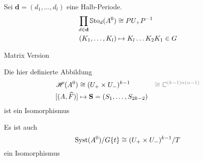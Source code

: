 \begin{frame}[t]
  \begin{lem}
    Sei $\textbf{d}=(d_1,\dots,d_l)$ eine Halb-Periode.
    \begin{align*}
      \prod_{d\in\textbf{d}}\operatorname{\mathbb{S}to}_d(A^0) &\cong PU_+P^{-1}\\
      (K_1,\dots,K_l) &\mapsto K_l\dots K_2K_1\in G
    \end{align*}
  \end{lem}
\end{frame}
\begin{frame}{Matrix Version}
  \begin{tthm}
    Die hier definierte Abbildung
    \begin{align*}
      \sH(A^0)&\cong(U_+\times U_-)^{k-1}
      &\textcolor{gray}{\cong\C^{(k-1)n(n-1)}}
    \\ [(A,\hat F)]&\mapsto\textbf{S}=(S_1,\dots,S_{2k-2})
    \end{align*}
    ist ein Isomorphismus
    \begin{cor}
      Es ist auch 
      \[
        \operatorname{Syst}(A^0)/G\{t\}\cong(U_+\times U_-)^{k-1}/T
      \]
      ein Isomorphismus
    \end{cor}
  \end{tthm}
\end{frame}
